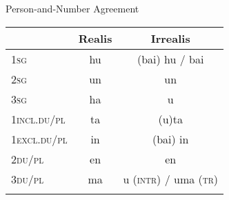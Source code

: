 \documentclass[output=paper,
modfonts
]{LSP/langsci}
\begin{document}
\begin{exe}
\begin{xlist}
\ea Person-and-Number Agreement\\
	\begin{tabular}{lcc}
	\lsptoprule
	& Realis & Irrealis \\
	\midrule
	1\textsc{sg}& hu & (bai) hu / bai \\
	
	2\textsc{sg}& un & un\\
	
	3\textsc{sg}& ha & u\\
	
	1\textsc{incl.du/pl} & ta & (u)ta\\
	
	1\textsc{excl.du/pl} & in & (bai) in\\
	
	2\textsc{du/pl} & en & en\\
	
	3\textsc{du/pl} & ma & u (\textsc{intr}) / uma (\textsc{tr}) \\
	\lspbottomrule
	\end{tabular}
\label{tab:persnumagr}
\z

%
%
%
%
%
%
%
%
%
%
%
%


\end{xlist}
\end{exe}
\end{document}
